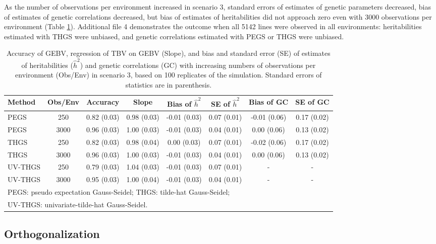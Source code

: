 \documentclass{bmcart}
\begin{document}
As the number of observations per environment increased in scenario 3, standard errors of estimates of genetic parameters decreased, bias of estimates of genetic correlations decreased, but bias of estimates of heritabilities did not approach zero even with 3000 observations per environment (Table \ref{VaryN}). Additional file 4 demonstrates the outcome when all 5142 lines were observed in all environments: heritabilities estimated with THGS were unbiased, and genetic correlations estimated with PEGS or THGS were unbiased.

\begin{table}[ht]
\centering
\renewcommand*{\arraystretch}{1.2}
\caption{Accuracy of GEBV, regression of TBV on GEBV (Slope), and bias and standard error (SE) of estimates of heritabilities ($\hat{h}^2$) and genetic correlations (GC) with increasing numbers of observations per environment (Obs/Env) in scenario 3, based on 100 replicates of the simulation. Standard errors of statistics are in parenthesis.}\smallskip
\begin{tabular}{l c c c c c c c}
 \hline
Method & Obs/Env & Accuracy & Slope & Bias of $\hat{h}^2$ & SE of $\hat{h}^2$ & Bias of GC& SE of GC \\
 \hline
PEGS & 250 & 0.82 (0.03) & 0.98 (0.03) & -0.01 (0.03) & 0.07 (0.01) & -0.01 (0.06) & 0.17 (0.02) \\
PEGS & 3000 & 0.96 (0.03) & 1.00 (0.03) & -0.01 (0.03) & 0.04 (0.01) & 0.00 (0.06) & 0.13 (0.02) \\
THGS & 250 & 0.82 (0.03) & 0.98 (0.04) & 0.00 (0.03) & 0.07 (0.01) & -0.02 (0.06) & 0.17 (0.02) \\
THGS & 3000 & 0.96 (0.03) & 1.00 (0.03) & -0.01 (0.03) & 0.04 (0.01) & 0.00 (0.06) & 0.13 (0.02) \\
UV-THGS & 250 & 0.79 (0.03) & 1.04 (0.03) & -0.01 (0.03) & 0.07 (0.01) & - & - \\
UV-THGS & 3000 & 0.95 (0.03) & 1.00 (0.04) & -0.01 (0.03) & 0.04 (0.01) & - & - \\
 \hline
\multicolumn{8}{l}{\small PEGS: pseudo expectation Gauss-Seidel; THGS: tilde-hat Gauss-Seidel;}\\
\multicolumn{8}{l}{\small UV-THGS: univariate-tilde-hat Gauss-Seidel.}\\
\end{tabular}
\label{VaryN}
\end{table}

\subsection{Orthogonalization}
\end{document}
